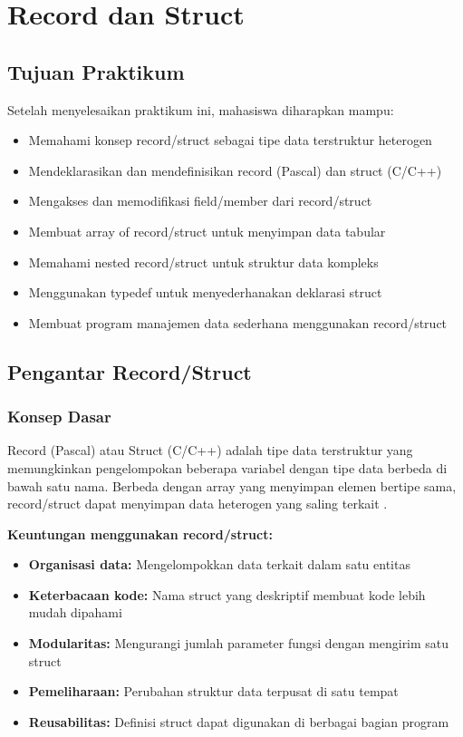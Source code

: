 \documentclass[../main.tex]{subfiles}
\begin{document}
\chapter{Record dan Struct}

\section*{Tujuan Praktikum}
Setelah menyelesaikan praktikum ini, mahasiswa diharapkan mampu:
\begin{itemize}
  \item Memahami konsep record/struct sebagai tipe data terstruktur heterogen
  \item Mendeklarasikan dan mendefinisikan record (Pascal) dan struct (C/C++)
  \item Mengakses dan memodifikasi field/member dari record/struct
  \item Membuat array of record/struct untuk menyimpan data tabular
  \item Memahami nested record/struct untuk struktur data kompleks
  \item Menggunakan typedef untuk menyederhanakan deklarasi struct
  \item Membuat program manajemen data sederhana menggunakan record/struct
\end{itemize}

\section{Pengantar Record/Struct}

\subsection{Konsep Dasar}
Record (Pascal) atau Struct (C/C++) adalah tipe data terstruktur yang memungkinkan pengelompokan beberapa variabel dengan tipe data berbeda di bawah satu nama. Berbeda dengan array yang menyimpan elemen bertipe sama, record/struct dapat menyimpan data heterogen yang saling terkait \parencite{pascal-structs,c-struct,cpp-struct-class,duniailkom-struct-c,tutorialspoint-c-structures}.

\textbf{Keuntungan menggunakan record/struct:}
\begin{itemize}
  \item \textbf{Organisasi data:} Mengelompokkan data terkait dalam satu entitas
  \item \textbf{Keterbacaan kode:} Nama struct yang deskriptif membuat kode lebih mudah dipahami
  \item \textbf{Modularitas:} Mengurangi jumlah parameter fungsi dengan mengirim satu struct
  \item \textbf{Pemeliharaan:} Perubahan struktur data terpusat di satu tempat
  \item \textbf{Reusabilitas:} Definisi struct dapat digunakan di berbagai bagian program
\end{itemize}
\end{document}
